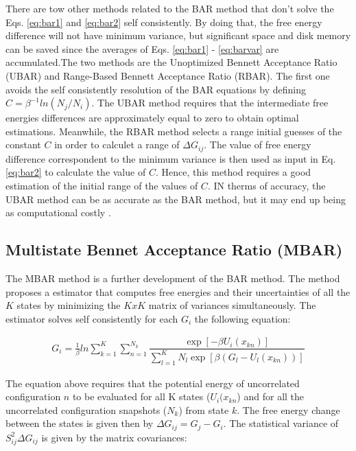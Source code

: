There are tow other methods related to the BAR method that don't solve the Eqs. \eqref{eq:bar1} and \eqref{eq:bar2} self consistently. By doing that, the free energy difference will not have minimum variance, but significant space and disk memory can be saved since the averages of Eqs. \eqref{eq:bar1} - \eqref{eq:barvar} are accumulated.The two methods are the Unoptimized Bennett Acceptance Ratio (UBAR) and Range-Based Bennett Acceptance Ratio (RBAR). The first one avoids the self consistently resolution of the BAR equations by defining $C=\beta^{-1}ln(N_{j}/N_{i})$. The UBAR method requires that the intermediate free energies differences are approximately equal to zero to obtain optimal estimations. Meanwhile, the RBAR method selects a range initial guesses of the constant $C$ in order to calculet a range  of $\Delta G_{ij}$. The value of free energy difference correspondent to the minimum variance is then used as input in Eq. \eqref{eq:bar2} to calculate the value of $C$. Hence, this method requires a good estimation of the initial range of the values of $C$. IN therms of accuracy, the UBAR method can be as accurate as the BAR method, but it may end up being as computational costly \cite{bareva}.  

\subsection{Multistate Bennet Acceptance Ratio (MBAR)}\label{mbar}

The MBAR method \cite{mbar} is a further development of the BAR method. The method proposes a estimator that computes free energies and their uncertainties of all the $K$ states  by minimizing the $KxK$ matrix of variances simultaneously. The estimator solves self consistently for each $G_{i}$ the following equation:

\begin{equation}
\label{eq:mbar}
\begin{aligned}
 G_{i} = \frac{1}{\beta}ln \sum_{k=1}^{K} \sum_{n=1}^{N_{k}}
 \dfrac{\exp[-\beta U_{i}(x_{kn})]}{\sum_{l=1}^{K} N_{l} \exp[\beta (G_{l} - U_{l}(x_{kn}))]}
\end{aligned}
\end{equation}

The equation above requires that the potential energy  of uncorrelated configuration $n$ to be evaluated for all K states ($U_{i}(x_{kn}$) and for all the uncorrelated configuration snapshots ($N_{k}$) from state $k$. The free energy change between the states is given then by $\Delta G_{ij} = G_{j} -  G_{i}$. The statistical variance of $S_{ij}^{2} \Delta G_{ij}$ is given by the matrix covariances:

